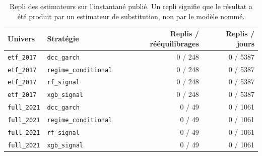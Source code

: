 \newcommand{\integriteVerdict}{Sur l'instantané publié, 0 ajustement sur 1188 — 4 stratégies évaluées, 297 dates de rééquilibrage — n'a utilisé de repli : chaque résultat rapporté ici a été produit par le modèle que son étiquette désigne. La portée de cette affirmation est exactement l'ensemble compté ci-dessus.}
\newcommand{\integriteAjustements}{1188}
\newcommand{\integriteReplis}{0}

\begin{table}[htbp]
  \centering
  \small
  \caption[Intégrité des modèles]{Repli des estimateurs sur l'instantané publié. Un repli signifie que le résultat a été produit par un estimateur de substitution, non par le modèle nommé.}
  \label{tab:integrite}
  \begin{tabular}{@{}llrr@{}}
    \toprule
    Univers & Stratégie & Replis / rééquilibrages & Replis / jours \\
    \midrule
    \texttt{etf\_2017} & \texttt{dcc\_garch} & 0 / 248 & 0 / 5387 \\
    \texttt{etf\_2017} & \texttt{regime\_conditional} & 0 / 248 & 0 / 5387 \\
    \texttt{etf\_2017} & \texttt{rf\_signal} & 0 / 248 & 0 / 5387 \\
    \texttt{etf\_2017} & \texttt{xgb\_signal} & 0 / 248 & 0 / 5387 \\
    \texttt{full\_2021} & \texttt{dcc\_garch} & 0 / 49 & 0 / 1061 \\
    \texttt{full\_2021} & \texttt{regime\_conditional} & 0 / 49 & 0 / 1061 \\
    \texttt{full\_2021} & \texttt{rf\_signal} & 0 / 49 & 0 / 1061 \\
    \texttt{full\_2021} & \texttt{xgb\_signal} & 0 / 49 & 0 / 1061 \\
    \bottomrule
  \end{tabular}
\end{table}

